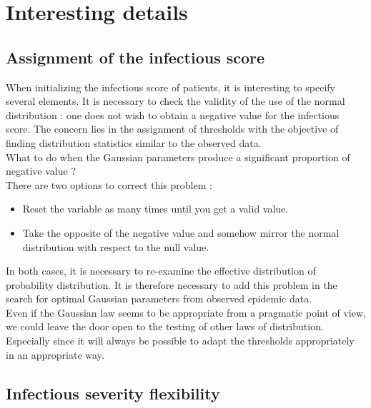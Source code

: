 \newpage

\section{Interesting details}

\subsection{Assignment of the infectious score}

When initializing the infectious score of patients, it is interesting to specify several elements. It is necessary to check the validity of the use of the normal distribution : one does not wish to obtain a negative value for the infectious score. The concern lies in the assignment of thresholds with the objective of finding distribution statistics similar to the observed data.\\

What to do when the Gaussian parameters produce a significant proportion of negative value ?\\

There are two options to correct this problem :\\

\begin{itemize}
\item Reset the variable as many times until you get a valid value.
\item Take the opposite of the negative value and somehow mirror the normal distribution with respect to the null value.\\
\end{itemize}

In both cases, it is necessary to re-examine the effective distribution of probability distribution. It is therefore necessary to add this problem in the search for optimal Gaussian parameters from observed epidemic data.\\

Even if the Gaussian law seems to be appropriate from a pragmatic point of view, we could leave the door open to the testing of other laws of distribution. Especially since it will always be possible to adapt the thresholds appropriately in an appropriate way.\\

\subsection{Infectious severity flexibility}

